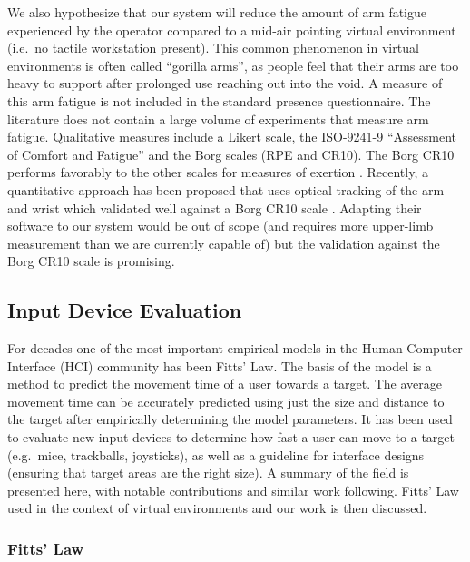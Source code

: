 We also hypothesize that our system will reduce the amount of arm fatigue experienced by the operator compared to a mid-air pointing virtual environment (i.e.\ no tactile workstation present).
This common phenomenon in virtual environments is often called ``gorilla arms'', as people feel that their arms are too heavy to support after prolonged use reaching out into the void.
A measure of this arm fatigue is not included in the standard presence questionnaire.
The literature does not contain a large volume of experiments that measure arm fatigue.
Qualitative measures include a Likert scale, the ISO-9241-9 ``Assessment of Comfort and Fatigue'' and the Borg scales (RPE and CR10).
The Borg CR10 performs favorably to the other scales for measures of exertion \citep{grant_comparison_1999}.
Recently, a quantitative approach has been proposed that uses optical tracking of the arm and wrist which validated well against a Borg CR10 scale \citep{hincapie-ramos_consumed_2014}.
Adapting their software to our system would be out of scope (and requires more upper-limb measurement than we are currently capable of) but the validation against the Borg CR10 scale is promising.

\subsection{Input Device Evaluation}
\label{input-device-evaluation}

For decades one of the most important empirical models in the Human-Computer Interface (HCI) community has been Fitts' Law.
The basis of the model is a method to predict the movement time of a user towards a target.
The average movement time can be accurately predicted using just the size and distance to the target after empirically determining the model parameters.
It has been used to evaluate new input devices to determine how fast a user can move to a target (e.g.\ mice, trackballs, joysticks), as well as a guideline for interface designs (ensuring that target areas are the right size).
A summary of the field is presented here, with notable contributions and similar work following.
Fitts' Law used in the context of virtual environments and our work is then discussed.

\subsubsection{Fitts' Law}
\label{fitts-law}


